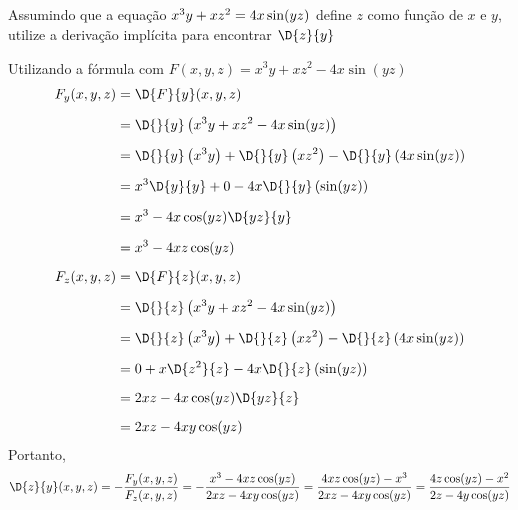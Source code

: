 \documentclass[a4paper,12pt,fleqn]{article}
\begin{document}
Assumindo que a equação
\(
  x^3y + xz^2 = 4x\sin(yz)
  \vphantom{\int}
\)
define $z$ como função de $x$ e $y$,
utilize a derivação implícita para encontrar \(\D{z}{y}\)

\begin{answer}
  Utilizando a fórmula com \(F(x, y, z) = x^3y + xz^2 - 4x\sin(yz)\)
  \begin{align*}
    F_y(x, y, z)
    & = \D{F}{y}(x, y, z) \\[2mm]
    & = \D{}{y} \left(x^3y + xz^2 - 4x\sin(yz)\right) \\[2mm]
    & = \D{}{y} \left(x^3y\right) + \D{}{y} \left(xz^2\right) - \D{}{y} \left(4x\sin(yz)\right) \\[2mm]
    & = x^3\D{y}{y} + 0 - 4x\D{}{y} \left(\sin(yz)\right) \\[2mm]
    & = x^3 - 4x\cos(yz)\D{yz}{y} \\[2mm]
    & = x^3 - 4xz\cos(yz) \\[2mm]
    F_z(x, y, z)
    & = \D{F}{z}(x, y, z) \\[2mm]
    & = \D{}{z} \left(x^3y + xz^2 - 4x\sin(yz)\right) \\[2mm]
    & = \D{}{z} \left(x^3y\right) + \D{}{z} \left(xz^2\right) - \D{}{z} \left(4x\sin(yz)\right) \\[2mm]
    & = 0 + x\D{z^2}{z} - 4x\D{}{z} \left(\sin(yz)\right) \\[2mm]
    & = 2xz - 4x\cos(yz)\D{yz}{z} \\[2mm]
    & = 2xz - 4xy\cos(yz)
  \end{align*}
  Portanto,
  \[
  \D{z}{y}(x, y, z)
    = -\frac{F_y(x, y, z)}{F_z(x, y, z)}
    = -\frac{x^3 - 4xz\cos(yz)}{2xz - 4xy\cos(yz)}
    = \frac{4xz\cos(yz)-x^3}{2xz - 4xy\cos(yz)}
    = \frac{4z\cos(yz)-x^2}{2z - 4y\cos(yz)}
  \]
\end{answer}

\end{document}
